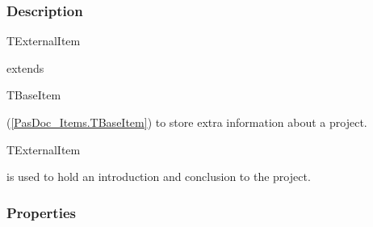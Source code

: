 \documentclass{report}
\begin{document}
\subsubsection*{\large{\textbf{Description}}\normalsize\hspace{1ex}\hfill}
\begin{ttfamily}TExternalItem\end{ttfamily} extends \begin{ttfamily}TBaseItem\end{ttfamily}(\ref{PasDoc_Items.TBaseItem}) to store extra information about a project. \begin{ttfamily}TExternalItem\end{ttfamily} is used to hold an introduction and conclusion to the project.\subsubsection*{\large{\textbf{Properties}}\normalsize\hspace{1ex}\hfill}
\end{document}
